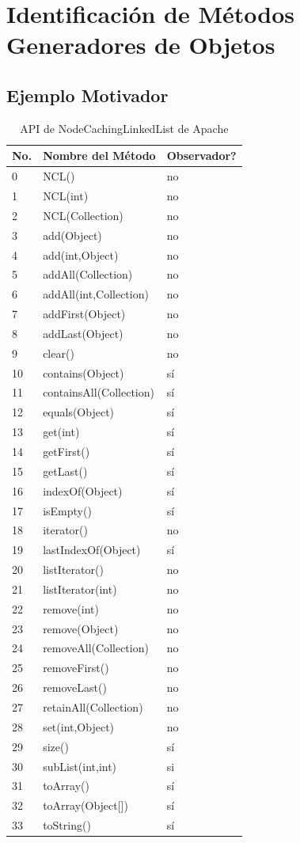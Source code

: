 \chapter[Identificación de Métodos Generadores de Objetos]{Identificación de Métodos Generadores de Objetos}
\label{cap:builders}


\section{Ejemplo Motivador}

\begin{table}[]
\centering
{\scriptsize
\begin{tabular}{|l|l|l|}
\hline
No. & Nombre del Método & Observador? \\
\hline
0 & NCL() & no \\
1 & NCL(int) & no \\
2 & NCL(Collection) & no \\
3 & add(Object) & no \\
4 & add(int,Object) & no \\
5 & addAll(Collection) & no \\
6 & addAll(int,Collection) & no \\
7 & addFirst(Object) & no \\
8 & addLast(Object) & no \\
9 & clear() & no \\
10 & contains(Object) & sí \\
11 & containsAll(Collection) & sí \\
12 & equals(Object) & sí \\
13 & get(int) & sí \\
14 & getFirst() & sí \\
15 & getLast() & sí \\
16 & indexOf(Object) & sí \\
17 & isEmpty() & sí \\
18 & iterator() & no \\
19 & lastIndexOf(Object) & sí \\
20 & listIterator() & no \\
21 & listIterator(int) & no \\
22 & remove(int) & no \\
23 & remove(Object) & no \\
24 & removeAll(Collection) & no \\
25 & removeFirst() & no \\
26 & removeLast() & no \\
27 & retainAll(Collection) & no \\
28 & set(int,Object) & no \\
29 & size() & sí \\
30 & subList(int,int) & si \\
31 & toArray() & sí \\
32 & toArray(Object[]) & sí \\
33 & toString() & sí \\
\hline
\end{tabular}
}
\caption{API de NodeCachingLinkedList de Apache}
\label{tab:ncl-api}
\end{table}
